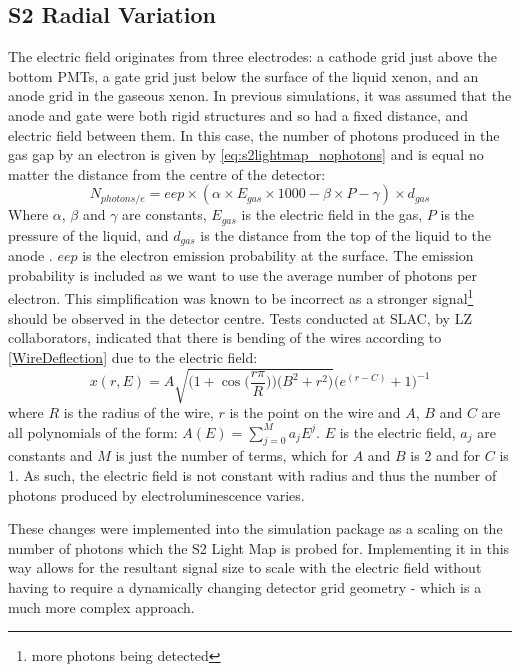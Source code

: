 \subsection{S2 Radial Variation} \label{sec:s2radialvariation}
\par
The electric field originates from three electrodes: a cathode grid just above the bottom PMTs, a gate grid just below the surface of the liquid xenon, and an anode grid in the gaseous xenon.
In previous simulations, it was assumed that the anode and gate were both rigid structures and so had a fixed distance, and electric field between them.
In this case, the number of photons produced in the gas gap by an electron is given by \autoref{eq:s2lightmap_nophotons} and is equal no matter the distance from the centre of the detector:
\begin{equation}
    N_{photons/e} = eep \times (\alpha \times E_{gas} \times 1000 - \beta \times P - \gamma) \times d_{gas}
    \label{eq:s2lightmap_nophotons}
\end{equation}
Where $\alpha$, $\beta$ and $\gamma$ are constants, $E_{gas}$ is the electric field in the gas, $P$ is the pressure of the liquid, and $d_{gas}$ is the distance from the top of the liquid to the anode \cite{NoPhotonsPerElectron}.
$eep$ is the electron emission probability at the surface.
The emission probability is included as we want to use the average number of photons per electron.
This simplification was known to be incorrect as a stronger signal\footnote{more photons being detected} should be observed in the detector centre.
Tests conducted at SLAC, by LZ collaborators, indicated that there is bending of the wires according to \autoref{WireDeflection} due to the electric field:
\begin{equation}
    x(r,E) = A \sqrt{ \bigg( 1 + \cos{ \Big( \frac{r \pi}{R} } \Big) \bigg) \bigg( B^2 + r^2 \bigg) } \bigg( e^{(r-C)} + 1 \bigg)^{-1} 
    \label{WireDeflection}
\end{equation}
where $R$ is the radius of the wire, $r$ is the point on the wire and $A$, $B$ and $C$ are all polynomials of the form: $A(E) = \sum_{j=0}^{M} a_{j} E^{j}$. $E$ is the electric field, $a_{j}$ are constants and $M$ is just the number of terms, which for $A$ and $B$ is 2 and for $C$ is 1.
As such, the electric field is not constant with radius and thus the number of photons produced by electroluminescence varies.
\par
These changes were implemented into the simulation package as a scaling on the number of photons which the S2 Light Map is probed for.
Implementing it in this way allows for the resultant signal size to scale with the electric field without having to require a dynamically changing detector grid geometry - which is a much more complex approach.
